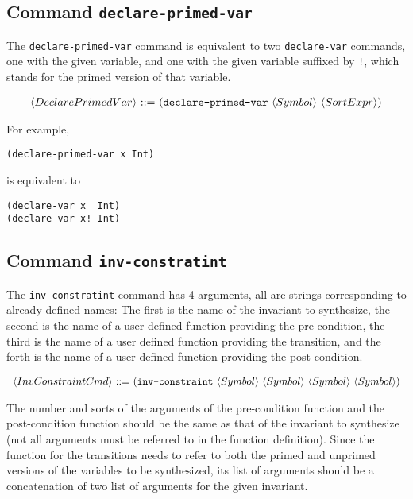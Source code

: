 \documentclass{llncs}
\begin{document}
\subsection*{Command \texttt{declare-primed-var}}
The
\texttt{declare-primed-var} command is equivalent to two \texttt{declare-var} commands, one with the given variable, and one with the given variable suffixed by \texttt{!}, which stands for the primed version of that variable. 

$$\begin{array}{r@{~::=~}l}
\la DeclarePrimedVar \ra &(\texttt{declare-primed-var}~\la Symbol \ra  ~\la SortExpr \ra)\\
\end{array}$$

For example,
\begin{verbatim}
(declare-primed-var x Int)
\end{verbatim}

is equivalent to
\begin{verbatim}
(declare-var x  Int)
(declare-var x! Int)
\end{verbatim}

\subsection*{Command \texttt{inv-constratint}}
The \texttt{inv-constratint} command has 4 arguments, all are strings corresponding to already defined names: The first is the name of the invariant to synthesize, the second is the name of a user defined function providing the pre-condition, the third is the name of a user defined function providing the transition, and the forth is the name of a user defined function providing the post-condition.

$$\begin{array}{r@{~::=~}l}
\la InvConstraintCmd\ra & (\texttt{inv-constraint} ~\la Symbol \ra ~\la Symbol \ra ~\la Symbol \ra ~\la Symbol \ra)\\
\end{array}$$

The number and sorts of the arguments of the pre-condition function and the post-condition function should be the same as that of the invariant to synthesize (not all arguments must be referred to in the function definition). Since the function for the transitions needs to refer to both the primed and unprimed versions of the variables to be synthesized, its list of arguments should be a concatenation of two list of arguments for the given invariant. 
\end{document}
